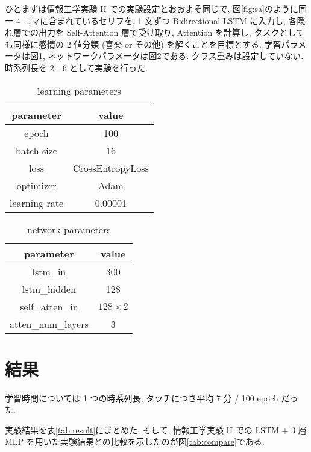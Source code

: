 \documentclass[twocolumn]{jarticle}     %
\begin{document}
ひとまずは情報工学実験 II での実験設定とおおよそ同じで, 図\ref{fig:sa}のように同一 4 コマに含まれているセリフを, 1 文ずつ
Bidirectional LSTM に入力し, 各隠れ層での出力を Self-Attention 層で受け取り, Attention を計算し, タスクとしても同様に感情の 2 値分類 (喜楽 or その他) を解くことを目標とする. 学習パラメータは図\ref{tab:s-A}, ネットワークパラメータは図\ref{tab:net}である. クラス重みは設定していない. 時系列長を 2 - 6 として実験を行った.

\begin{table}[htb]
\begin{center}
\caption{learning parameters}
\begin{tabular}{|c|c|}
\hline
parameter & value \\ \hline
epoch & 100   \\
batch size    & 16    \\
loss & CrossEntropyLoss     \\
optimizer  & Adam     \\
learning rate     & 0.00001  \\ \hline
\end{tabular}
\label{tab:s-A}
\end{center}
\end{table}

\begin{table}[tbh]
\begin{center}
\caption{network parameters}
\begin{tabular}{|c|c|}
\hline
parameter & value \\ \hline
lstm\_in & 300   \\
lstm\_hidden    & 128    \\
self\_atten\_in & $128 \times 2$     \\
atten\_num\_layers & 3     \\ \hline
\end{tabular}
\label{tab:net}
\end{center}
\end{table}

\section{結果}
学習時間については 1 つの時系列長, タッチにつき平均 7 分 / 100 epoch だった.

実験結果を表\ref{tab:result}にまとめた. そして, 情報工学実験 II での LSTM + 3 層 MLP を用いた実験結果との比較を示したのが図\ref{tab:compare}である.
\end{document}
